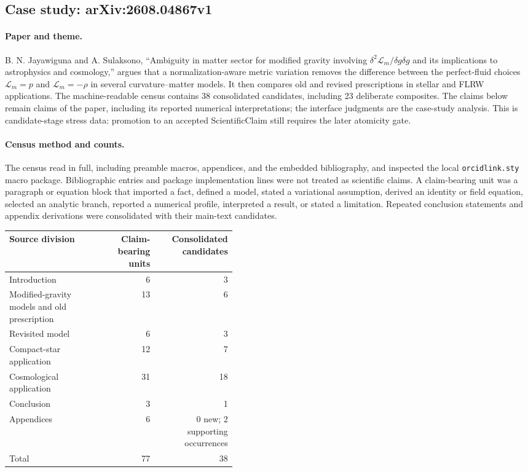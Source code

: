 \subsection{Case study: arXiv:2608.04867v1}
\label{case:2608-04867}

\paragraph{Paper and theme.}
B. N. Jayawiguna and A. Sulaksono, ``Ambiguity in matter sector for modified gravity involving $\delta^2\mathcal L_m/\delta g\delta g$ and its implications to astrophysics and cosmology,'' argues that a normalization-aware metric variation removes the difference between the perfect-fluid choices $\mathcal L_m=p$ and $\mathcal L_m=-\rho$ in several curvature--matter models. It then compares old and revised prescriptions in stellar and FLRW applications. The machine-readable census contains 38 consolidated candidates, including 23 deliberate composites. The claims below remain claims of the paper, including its reported numerical interpretations; the interface judgments are the case-study analysis. This is candidate-stage stress data: promotion to an accepted ScientificClaim still requires the later atomicity gate.

\paragraph{Census method and counts.}
The census read  in full, including preamble macros, appendices, and the embedded bibliography, and inspected the local \texttt{orcidlink.sty} macro package. Bibliographic entries and package implementation lines were not treated as scientific claims. A claim-bearing unit was a paragraph or equation block that imported a fact, defined a model, stated a variational assumption, derived an identity or field equation, selected an analytic branch, reported a numerical profile, interpreted a result, or stated a limitation. Repeated conclusion statements and appendix derivations were consolidated with their main-text candidates.

\begin{center}
\begin{tabular}{p{0.43\linewidth}rr}
\hline
Source division & Claim-bearing units & Consolidated candidates \\
\hline
Introduction & 6 & 3 \\
Modified-gravity models and old prescription & 13 & 6 \\
Revisited model & 6 & 3 \\
Compact-star application & 12 & 7 \\
Cosmological application & 31 & 18 \\
Conclusion & 3 & 1 \\
Appendices & 6 & 0 new; 2 supporting occurrences \\
\hline
Total & 77 & 38 \\
\hline
\end{tabular}
\end{center}

